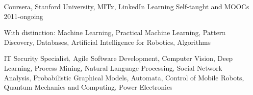 \begin{cventries}
	\cventry%
		{Coursera, Stanford University, MITx, LinkedIn Learning}
		{Self-taught and MOOCs}
		{}
		{2011-ongoing}
		{\begin{cvitems}
			\item {With distinction:
				Machine Learning,
				Practical Machine Learning,
				Pattern Discovery,
				Databases,
				Artificial Intelligence for Robotics,
				Algorithms
				}
			\item {%
				IT Security Specialist,
				Agile Software Development,
				Computer Vision,
				Deep Learning,
				Process Mining,
				Natural Language Processing,
				Social Network Analysis,
				Probabilistic Graphical Models,
				Automata,
				Control of Mobile Robots,
				Quantum Mechanics and Computing,
				Power Electronics
				}
		\end{cvitems}}
\end{cventries}
